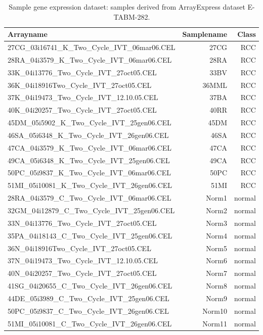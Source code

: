 \documentclass[a4paper,10pt]{article}
\begin{document}
\begin{table}[hbt]
 \centering
\begin{tabular}{ | l | r | r |}
\hline
Arrayname & Samplename & Class \\
\hline
27CG\_03i16741\_K\_Two\_Cycle\_IVT\_06mar06.CEL & 27CG & RCC \\
\hline
28RA\_04i3579\_K\_Two\_Cycle\_IVT\_06mar06.CEL & 28RA & RCC \\
\hline
33K\_04i13776\_Two\_Cycle\_IVT\_27oct05.CEL & 33BV & RCC \\
\hline
36K\_04i18916Two\_Cycle\_IVT\_27oct05.CEL & 36MML & RCC \\
\hline
37K\_04i19473\_Two\_Cycle\_IVT\_12.10.05.CEL & 37BA & RCC \\
\hline
40K\_04i20257\_Two\_Cycle\_IVT\_27oct05.CEL & 40RR & RCC \\
\hline
45DM\_05i5902\_K\_Two\_Cycle\_IVT\_25gen06.CEL & 45DM & RCC \\
\hline
46SA\_05i6348\_K\_Two\_Cycle\_IVT\_26gen06.CEL & 46SA & RCC \\
\hline
47CA\_04i3579\_K\_Two\_Cycle\_IVT\_06mar06.CEL & 47CA & RCC \\
\hline
49CA\_05i6348\_K\_Two\_Cycle\_IVT\_25gen06.CEL & 49CA & RCC \\
\hline
50PC\_05i9837\_K\_Two\_Cycle\_IVT\_06mar06.CEL & 50PC & RCC \\
\hline
51MI\_05i10081\_K\_Two\_Cycle\_IVT\_26gen06.CEL & 51MI & RCC \\
\hline
28RA\_04i3579\_C\_Two\_Cycle\_IVT\_06mar06.CEL & Norm1 & normal \\
\hline
32GM\_04i12879\_C\_Two\_Cycle\_IVT\_25gen06.CEL & Norm2 & normal \\
\hline
33N\_04i13776\_Two\_Cycle\_IVT\_27oct05.CEL & Norm3 & normal \\
\hline
35PA\_04i18143\_C\_Two\_Cycle\_IVT\_25gen06.CEL & Norm4 & normal \\
\hline
36N\_04i18916Two\_Cycle\_IVT\_27oct05.CEL & Norm5 & normal \\
\hline
37N\_04i19473\_Two\_Cycle\_IVT\_12.10.05.CEL & Norm6 & normal \\
\hline
40N\_04i20257\_Two\_Cycle\_IVT\_27oct05.CEL & Norm7 & normal \\
\hline
41SG\_04i20655\_C\_Two\_Cycle\_IVT\_26gen06.CEL & Norm8 & normal \\
\hline
44DE\_05i3989\_C\_Two\_Cycle\_IVT\_25gen06.CEL & Norm9 & normal \\
\hline
50PC\_05i9837\_C\_Two\_Cycle\_IVT\_26gen06.CEL & Norm10 & normal \\
\hline
51MI\_05i10081\_C\_Two\_Cycle\_IVT\_26gen06.CEL & Norm11 & normal \\
\hline
\end{tabular}
 \caption{Sample gene expression dataset: samples derived from ArrayExpress dataset E-TABM-282.}
 \label{tab:Samplegeneexpressiondataset}
\end{table}
\end{document}
